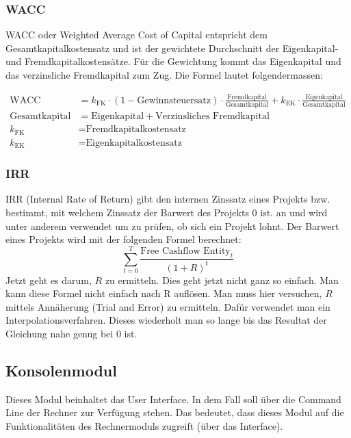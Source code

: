 \documentclass{article}
\begin{document}
\subsubsection{WACC}
WACC oder Weighted Average Cost of Capital entspricht dem Gesamtkapitalkostensatz und ist der gewichtete Durchschnitt der Eigenkapital- und Fremdkapitalkostensätze. Für die Gewichtung kommt das Eigenkapital und das verzinsliche Fremdkapital zum Zug. Die Formel lautet folgendermassen:

\begin{align*}
\textrm{WACC}&=k_{\textrm{FK}}\cdot(1 - \textrm{Gewinnsteuersatz})\cdot\frac{\textrm{Fremdkapital}}{\textrm{Gesamtkapital}}+k_{\textrm{EK}}\cdot\frac{\textrm{Eigenkapital}}{\textrm{Gesamtkapital}}\\
\textrm{Gesamtkapital}&=\textrm{Eigenkapital}+\textrm{Verzinsliches Fremdkapital}\\
k_\textrm{FK}&=\textrm{Fremdkapitalkostensatz}\\
k_\textrm{EK}&=\textrm{Eigenkapitalkostensatz}
\end{align*}
\subsubsection{IRR}
IRR (Internal Rate of Return) gibt den internen Zinssatz eines Projekts bzw. bestimmt, mit welchem Zinssatz der Barwert des Projekts 0 ist.  an und wird unter anderem verwendet um zu prüfen, ob sich ein Projekt lohnt. Der Barwert eines Projekts wird mit der folgenden Formel berechnet:
\[\sum_{t=0}^{T} \frac{\textrm{Free Cashflow Entity}_t}{(1+R)^t}\]
Jetzt geht es darum, $R$ zu ermitteln. Dies geht jetzt nicht ganz so einfach. Man kann diese Formel nicht einfach nach R auflösen. Man muss hier versuchen, $R$ mittels Annäherung (Trial and Error) zu ermitteln. Dafür verwendet man ein Interpolationsverfahren. Dieses wiederholt man so lange bis das Resultat der Gleichung nahe genug bei 0 ist.

\subsection{Konsolenmodul}
Dieses Modul beinhaltet das User Interface. In dem Fall soll über die Command Line der Rechner zur Verfügung stehen. Das bedeutet, dass dieses Modul auf die Funktionalitäten des Rechnermoduls zugreift (über das Interface).
\end{document}
